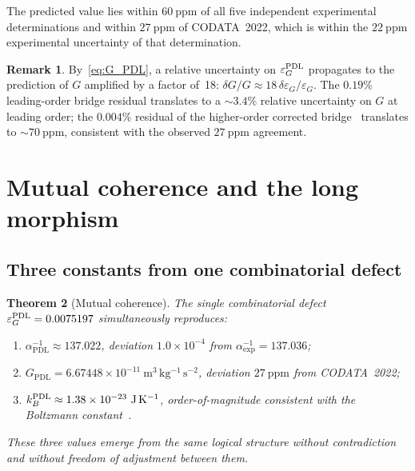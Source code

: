 \documentclass[11pt,a4paper]{article}
\newtheorem{theorem}{Theorem}[section]
\theoremstyle{definition}
\newtheorem{remark}[theorem]{Remark}
\newcommand{\PDL}{\textnormal{PDL}}
\newcommand{\epsg}{\varepsilon_G}
\newcommand{\alphaPDL}{\alpha_{\mathrm{PDL}}}
\newcommand{\GPDL}{G_{\mathrm{PDL}}}
\begin{document}
The predicted value lies within $60\ \mathrm{ppm}$ of all five independent experimental determinations and within $27\ \mathrm{ppm}$ of CODATA~2022, which is within the $22\ \mathrm{ppm}$ experimental uncertainty of that determination.

\begin{remark}
  \label{rem:G_sensitivity}
  By~\eqref{eq:G_PDL}, a relative uncertainty on $\epsg^{\PDL}$ propagates to the prediction of $G$ amplified by a factor of~18: $\delta G/G \approx 18\,\delta\epsg/\epsg$. The $0.19\%$ leading-order bridge residual translates to a $\sim 3.4\%$ relative uncertainty on $G$ at leading order; the $0.004\%$ residual of the higher-order corrected bridge~\cite{Bridge_Formula_PDL_2026} translates to $\sim 70\ \mathrm{ppm}$, consistent with the observed $27\ \mathrm{ppm}$ agreement.
\end{remark}

\section{Mutual coherence and the long morphism}
\label{sec:mutual}

\subsection{Three constants from one combinatorial defect}
\label{subsec:mutual_coherence}

\begin{theorem}[Mutual coherence]
  \label{thm:mutual}
  The single combinatorial defect $\epsg^{\PDL} = 0.0075197$ simultaneously
  reproduces:
  \begin{enumerate}[label=(\roman*)]
    \item $\alphaPDL^{-1} \approx 137.022$,
      deviation $1.0 \times 10^{-4}$ from $\alpha_{\mathrm{exp}}^{-1} = 137.036$;
    \item $\GPDL = 6.67448 \times 10^{-11}\ \mathrm{m^3\,kg^{-1}\,s^{-2}}$,
      deviation $27\ \mathrm{ppm}$ from CODATA~2022;
    \item $k_B^{\PDL} \approx 1.38 \times 10^{-23}\ \mathrm{J\,K^{-1}}$,
      order-of-magnitude consistent with the Boltzmann
      constant~\cite{PDL_Main_2026}.
  \end{enumerate}
  These three values emerge from the same logical structure without
  contradiction and without freedom of adjustment between them.
\end{theorem}
\end{document}
